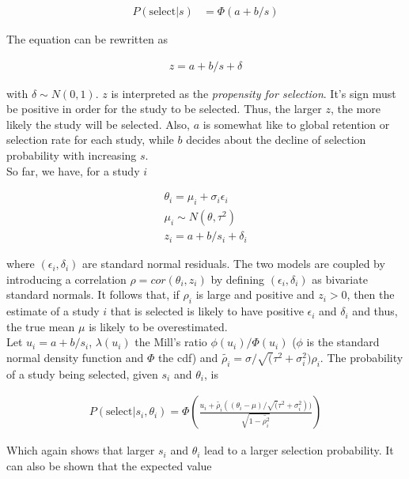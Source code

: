 \documentclass[11pt,a4paper,twoside]{book}\usepackage[]{graphicx}\usepackage[]{color}
\begin{document}
\begin{align}
P(\textrm{select}|s) &= \Phi(a + b/s) \nonumber %
\end{align}

The equation can be rewritten as 

\begin{align}
z = a + b/s + \delta \nonumber %
\end{align}

with $\delta \sim N(0,1)$. $z$ is interpreted as the \textit{propensity for selection}. It's sign must be positive in order for the study to be selected. Thus, the larger $z$, the more likely the study will be selected. Also, $a$ is somewhat like to global retention or selection rate for each study, while $b$ decides about the decline of selection probability with increasing $s$.\\
So far, we have, for a study $i$

\begin{align}
\theta_i = \mu_i + \sigma_i\epsilon_i \nonumber \\ 
\mu_i \sim N(\theta, \tau^2) \nonumber \\
z_i = a + b/s_i + \delta_i \nonumber
\end{align}

where $(\epsilon_i, \delta_i)$ are standard normal residuals. The two models are coupled by introducing a correlation $\rho = cor(\theta_i, z_i)$ by defining $(\epsilon_i, \delta_i)$ as bivariate standard normals. It follows that,
if $\rho_i$ is large and positive and $z_i > 0$, then the estimate of a study $i$ that is selected is likely to have positive $\epsilon_i$ and $\delta_i$ and thus, the true mean $\mu$ is likely to be overestimated. \\
Let $u_i = a + b/s_i$, $\lambda(u_i)$ the Mill's ratio $\phi(u_i)/\Phi(u_i)$ ($\phi$ is the standard normal density function and $\Phi$ the cdf) and $\tilde{\rho_i} = \sigma/\sqrt(\tau^2 + \sigma_i^2) \rho_i$. The probability of a study being selected, given $s_i$ and $\theta_i$, is

\begin{align}
P(\textrm{select}|s_i, \theta_i) = %
\Phi(\frac{u_i + \tilde{\rho_i}((\theta_i - \mu)/\sqrt(\tau^2 + \sigma_i^2))}{\sqrt{1 - \tilde{\rho_i^2}}}) \nonumber
\end{align}

Which again shows that larger $s_i$ and $\theta_i$ lead to a larger selection probability. It can also be shown that the expected value 
\end{document}
